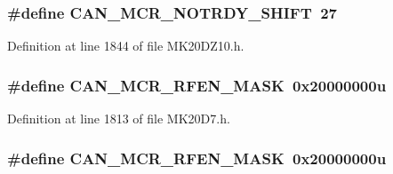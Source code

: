 \subsubsection[{\texorpdfstring{C\+A\+N\+\_\+\+M\+C\+R\+\_\+\+N\+O\+T\+R\+D\+Y\+\_\+\+S\+H\+I\+FT}{CAN_MCR_NOTRDY_SHIFT}}]{\setlength{\rightskip}{0pt plus 5cm}\#define C\+A\+N\+\_\+\+M\+C\+R\+\_\+\+N\+O\+T\+R\+D\+Y\+\_\+\+S\+H\+I\+FT~27}\hypertarget{group___c_a_n___register___masks_ga90886e532a436fbd5b6e94e723acd148}{}\label{group___c_a_n___register___masks_ga90886e532a436fbd5b6e94e723acd148}


Definition at line 1844 of file M\+K20\+D\+Z10.\+h.

\subsubsection[{\texorpdfstring{C\+A\+N\+\_\+\+M\+C\+R\+\_\+\+R\+F\+E\+N\+\_\+\+M\+A\+SK}{CAN_MCR_RFEN_MASK}}]{\setlength{\rightskip}{0pt plus 5cm}\#define C\+A\+N\+\_\+\+M\+C\+R\+\_\+\+R\+F\+E\+N\+\_\+\+M\+A\+SK~0x20000000u}\hypertarget{group___c_a_n___register___masks_ga55cd060ac6cdad670aeb97522a118930}{}\label{group___c_a_n___register___masks_ga55cd060ac6cdad670aeb97522a118930}


Definition at line 1813 of file M\+K20\+D7.\+h.

\subsubsection[{\texorpdfstring{C\+A\+N\+\_\+\+M\+C\+R\+\_\+\+R\+F\+E\+N\+\_\+\+M\+A\+SK}{CAN_MCR_RFEN_MASK}}]{\setlength{\rightskip}{0pt plus 5cm}\#define C\+A\+N\+\_\+\+M\+C\+R\+\_\+\+R\+F\+E\+N\+\_\+\+M\+A\+SK~0x20000000u}\hypertarget{group___c_a_n___register___masks_ga55cd060ac6cdad670aeb97522a118930}{}\label{group___c_a_n___register___masks_ga55cd060ac6cdad670aeb97522a118930}


